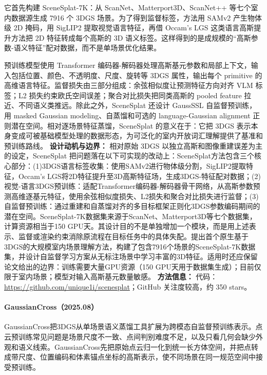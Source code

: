 它首先构建 SceneSplat-7K：从 ScanNet、Matterport3D、ScanNet++ 等七个室内数据源生成 7916 个 3DGS 场景。为了得到监督标签，方法用 SAMv2 产生物体级 2D 掩码，用 SigLIP2 提取视觉语言特征，再借 Occam's LGS 这类语言高斯提升方法把 2D 特征转成每个高斯的 3D 语义标签。这样得到的是成规模的“高斯参数-语义特征”配对数据，而不是单场景优化结果。

预训练模型使用 Transformer 编码器-解码器处理高斯基元参数和局部上下文，输入包括位置、颜色、不透明度、尺度、旋转等 3DGS 属性，输出每个 primitive 的高维语言特征。监督损失由三部分组成：余弦相似度让预测特征方向对齐 VLM 标签；L2 损失约束欧氏空间误差；聚合对比损失把同类高斯的 pooled feature 拉近、不同语义类推远。除此之外，SceneSplat 还设计 GaussSSL 自监督预训练，用 masked Gaussian modeling、自蒸馏和可选的 language-Gaussian alignment 正则潜在空间。相对逐场景特征蒸馏，SceneSplat 的意义在于：它把 3DGS 表示本身变成可被基础模型处理的数据形态，为可泛化的室内开放词汇理解提供了基准和预训练路线。
\textbf{设计动机与边界：} 相对原始 3DGS 以独立高斯和图像重建误差为主的设定，SceneSplat 把问题落在以下可实现的改动上：SceneSplat方法包含三个核心部分：(1)3DGS语言标签收集：使用SAMv2进行物体级分割，SigLIP2提取特征，Occam's LGS将2D特征提升至3D高斯特征场，生成3DGS-特征配对数据；(2)视觉-语言3DGS预训练：适配Transformer编码器-解码器骨干网络，从高斯参数预测高维逐基元特征，使用余弦相似度损失、L2损失和聚合对比损失进行监督；(3)自监督预训练：通过重建和自蒸馏对齐的多目标框架正则化3DGS参数编码期间的潜在空间。SceneSplat-7K数据集来源于ScanNet、Matterport3D等七个数据集，计算资源相当于150 GPU天。其设计目的不是单独增加一个模块，而是用上述表示、监督或渲染约束消除原流程在目标任务中的具体失配。提出首个原生基于3DGS的大规模室内场景理解方法，构建了包含7916个场景的SceneSplat-7K数据集，并设计自监督学习方案从无标注场景中学习丰富的3D特征。适用时还应保留论文给出的边界：训练需要大量GPU资源（150 GPU天用于数据集生成）；目前仅限于室内场景；模型对输入高斯基元数量敏感。
\textbf{方法信息：} 代码：\url{https://github.com/unique1i/scenesplat}；GitHub 关注度较高，约 350 stars。



\paragraph{GaussianCross（2025.08）\cite{2508_02172}}
GaussianCross把3DGS从单场景语义蒸馏工具扩展为跨模态自监督预训练表示。点云预训练常见问题是场景尺度不一致、点间判别难度不足，以及只看几何会缺少外观和语义线索。GaussianCross先把原始点云归一化到统一长方体空间，并把点转成带尺度、位置编码和体素锚点坐标的高斯表示，使不同场景在同一规范空间中接受预训练。

